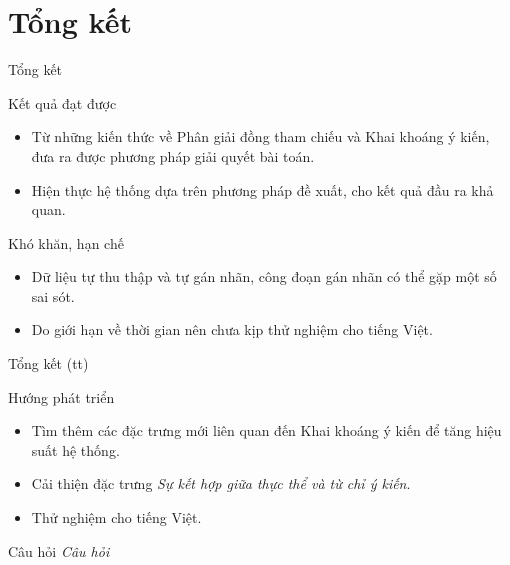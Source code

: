 \documentclass[9pt,xcolor=table,hyperref=unicode]{beamer}
\begin{document}
	\section{Tổng kết}
		\begin{frame}{Tổng kết}			
			\begin{block}{Kết quả đạt được}
				\begin{itemize}
					\item Từ những kiến thức về Phân giải đồng tham chiếu và Khai khoáng ý kiến, đưa ra được phương pháp giải quyết bài toán.
					\item Hiện thực hệ thống dựa trên phương pháp đề xuất, cho kết quả đầu ra khả quan.				
				\end{itemize}
			\end{block}
			\begin{block}{Khó khăn, hạn chế}
				\begin{itemize}
					\item Dữ liệu tự thu thập và tự gán nhãn, công đoạn gán nhãn có thể gặp một số sai sót. 
					\item Do giới hạn về thời gian nên chưa kịp thử nghiệm cho tiếng Việt.				
				\end{itemize}
			\end{block}
		\end{frame}
	
		\begin{frame}{Tổng kết (tt)}			
			\begin{block}{Hướng phát triển}
				\begin{itemize}
					\item Tìm thêm các đặc trưng mới liên quan đến Khai khoáng ý kiến để tăng hiệu suất hệ thống.
					\item Cải thiện đặc trưng \textit{Sự kết hợp giữa thực thể và từ chỉ ý kiến}.
					\item Thử nghiệm cho tiếng Việt.
				\end{itemize}
			\end{block}
		\end{frame}

		\begin{frame}{Câu hỏi}
			\Huge
			\centering
			\fontsize{30pt}{30}\selectfont
			\textit{Câu hỏi}
		\end{frame}
\end{document}
